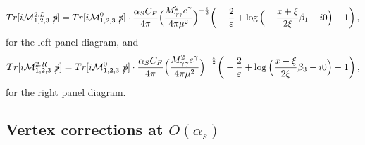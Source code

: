\documentclass[aps,prd,superscriptaddress,floatfix,showpacs]{revtex4}
\begin{document}
\begin{align}
Tr[i\mathcal{M}^{2.L}_{1,2,3}~\slashed{p}]%
=
Tr[i\mathcal{M}^{0}_{1,2,3}~\slashed{p}]\cdot
\frac{\alpha_S C_F}{4\pi}\Big( \frac{M^2_{\gamma\gamma} e^\gamma}{4\pi\mu^2} \Big)^{-\frac{\varepsilon}{2}}
\bigg{(} 
-\frac{2}{\varepsilon} + \log\Big(-\frac{x+\xi}{2\xi}\beta_1 -i0\Big)- 1 
\bigg{)}\,,
\label{eq:2L}
\end{align}
for the left panel diagram, and
\begin{align}
Tr[i\mathcal{M}^{2.R}_{1,2,3}~\slashed{p}]%
= Tr[i\mathcal{M}^{0}_{1,2,3}~\slashed{p}]\cdot
\frac{\alpha_S C_F}{4\pi}\Big( \frac{M^2_{\gamma\gamma} e^\gamma}{4\pi\mu^2} \Big)^{-\frac{\varepsilon}{2}}
\bigg{(} 
-\frac{2}{\varepsilon} + \log\Big(\frac{x-\xi}{2\xi}\beta_3 -i0\Big)- 1 
\bigg{)}\,,
\label{eq:2R}
\end{align}
for the right panel diagram.

\subsection{Vertex corrections at $O(\alpha_s)$}
\end{document}
